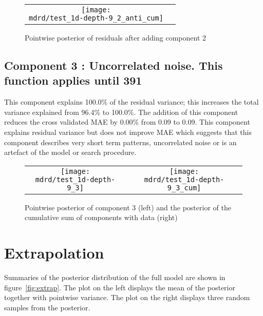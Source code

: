 \documentclass{article} %
\begin{document}
\begin{figure}[H]
\newcommand{\wmgd}{0.5\columnwidth}
\newcommand{\hmgd}{3.0cm}
\newcommand{\mdrd}{test_1d-depth-9}
\newcommand{\mbm}{\hspace{-0.3cm}}
\begin{tabular}{cc}
\mbm \texttt{[image: \\mdrd/test\_1d-depth-9\_2\_anti\_cum]}
\end{tabular}
\caption{Pointwise posterior of residuals after adding component 2}
\label{fig:comp2}
\end{figure}

\subsection{Component 3 : Uncorrelated noise. This function applies until  391}



This component explains 100.0\% of the residual variance; this increases the total variance explained from 96.4\% to 100.0\%.
The addition of this component reduces the cross validated MAE by 0.00\% from 0.09 to 0.09.
This component explains residual variance but does not improve MAE which suggests that this component describes very short term patterns, uncorrelated noise or is an artefact of the model or search procedure.

\begin{figure}[H]
\newcommand{\wmgd}{0.5\columnwidth}
\newcommand{\hmgd}{3.0cm}
\newcommand{\mdrd}{test_1d-depth-9}
\newcommand{\mbm}{\hspace{-0.3cm}}
\begin{tabular}{cc}
\mbm \texttt{[image: \\mdrd/test\_1d-depth-9\_3]} & \texttt{[image: \\mdrd/test\_1d-depth-9\_3\_cum]}
\end{tabular}
\caption{Pointwise posterior of component 3 (left) and the posterior of the cumulative sum of components with data (right)}
\label{fig:comp3}
\end{figure}

\section{Extrapolation}
\label{sec:extrap}

Summaries of the posterior distribution of the full model are shown in figure~\ref{fig:extrap}.
The plot on the left displays the mean of the posterior together with pointwise variance.
The plot on the right displays three random samples from the posterior.
\end{document}
